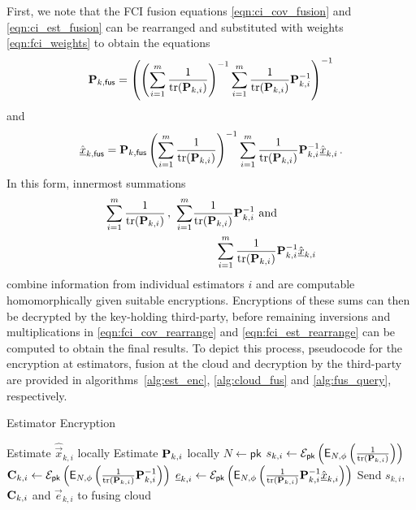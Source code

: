 \documentclass[letterpaper, 10 pt, conference]{ieeeconf}
\begin{document}
First, we note that the FCI fusion equations \eqref{eqn:ci_cov_fusion} and \eqref{eqn:ci_est_fusion} can be rearranged and substituted with weights \eqref{eqn:fci_weights} to obtain the equations
\begin{equation}\label{eqn:fci_cov_rearrange}
    {\ensuremath{{\mathbf{P}}}}_{k,\mathsf{fus}} = \left(\left(\sum_{i=1}^m \frac{1}{\operatorname{tr}({{\mathbf{P}}}_{k,i})}\right)^{-1}\sum_{i=1}^m \frac{1}{\operatorname{tr}({{\mathbf{P}}}_{k,i})}{{\mathbf{P}}}_{k,i}^{-1}\right)^{-1}
\end{equation}
and
\begin{equation}\label{eqn:fci_est_rearrange}
    \hat{{\underline{x}}}_{k,\mathsf{fus}} = {{\mathbf{P}}}_{k,\mathsf{fus}}\left(\sum_{i=1}^m \frac{1}{\operatorname{tr}({{\mathbf{P}}}_{k,i})}\right)^{-1}\sum_{i=1}^m\frac{1}{\operatorname{tr}({{\mathbf{P}}}_{k,i})}{{\mathbf{P}}}_{k,i}^{-1}\hat{{\underline{x}}}_{k,i}\,.
\end{equation}
In this form, innermost summations  
\begin{equation}
    \begin{split}
        \sum_{i=1}^m \frac{1}{\operatorname{tr}({{\mathbf{P}}}_{k,i})}\,,\ \sum_{i=1}^m &\frac{1}{\operatorname{tr}({{\mathbf{P}}}_{k,i})}{{\mathbf{P}}}_{k,i}^{-1}\text{ and }\\ 
        &\qquad\sum_{i=1}^m\frac{1}{\operatorname{tr}({{\mathbf{P}}}_{k,i})}{{\mathbf{P}}}_{k,i}^{-1}\hat{{\underline{x}}}_{k,i}
    \end{split}
\end{equation}
combine information from individual estimators $i$ and are computable homomorphically given suitable encryptions. Encryptions of these sums can then be decrypted by the key-holding third-party, before remaining inversions and multiplications in \eqref{eqn:fci_cov_rearrange} and \eqref{eqn:fci_est_rearrange} can be computed to obtain the final results. To depict this process, pseudocode for the encryption at estimators, fusion at the cloud and decryption by the third-party are provided in algorithms~\ref{alg:est_enc}, \ref{alg:cloud_fus} and \ref{alg:fus_query}, respectively.
\begin{algorithm}[htbp]
\caption{Estimator Encryption}\label{alg:est_enc}
\begin{algorithmic}[1]
    \State Estimate $\hat{\vec{x}}_{k,i}$ locally
    \State Estimate ${{\mathbf{P}}}_{k,i}$ locally
    \State $N \gets \mathsf{pk}$
    \State $s_{k,i} \gets \mathcal{E}_{\mathsf{pk}}\left(\mathsf{E}_{N,\phi}\left(\frac{1}{\operatorname{tr}({{\mathbf{P}}}_{k,i})}\right)\right)$
    \State ${{\mathbf{C}}}_{k,i} \gets \mathcal{E}_{\mathsf{pk}}\left(\mathsf{E}_{N,\phi}\left(\frac{1}{\operatorname{tr}({{\mathbf{P}}}_{k,i})}{{\mathbf{P}}}_{k,i}^{-1}\right)\right)$
    \State ${\underline{e}}_{k,i} \gets \mathcal{E}_{\mathsf{pk}}\left(\mathsf{E}_{N,\phi}\left(\frac{1}{\operatorname{tr}({{\mathbf{P}}}_{k,i})}{{\mathbf{P}}}_{k,i}^{-1}\hat{{\underline{x}}}_{k,i}\right)\right)$
    \State Send $s_{k,i}$, ${{\mathbf{C}}}_{k,i}$ and $\vec{e}_{k,i}$ to fusing cloud
    \EndProcedure
\end{algorithmic}
\end{algorithm}
\end{document}
